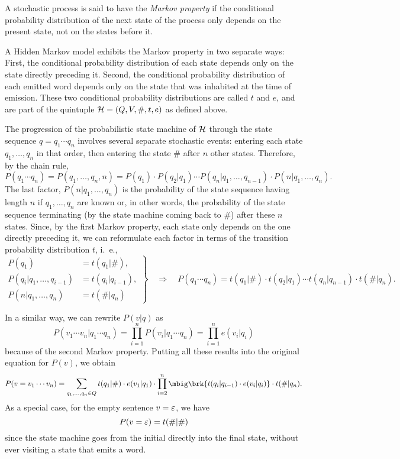 \begin{definition}
 A stochastic process is said to have the \emph{Markov property} if the
 conditional probability distribution of the next state of the process only
 depends on the present state, not on the states before it.
\end{definition}

A Hidden Markov model exhibits the Markov property in two separate ways: First,
the conditional probability distribution of each state depends only on the
state directly preceding it. Second, the conditional probability distribution
of each emitted word depends only on the state that was inhabited at the time
of emission. These two conditional probability distributions are called $t$ and
$e$, and are part of the quintuple $\mathcal H=(Q,V,\#,t,e)$ as defined above.

The progression of the probabilistic state machine of $\mathcal H$ through the state
sequence $q=q_1\cdots q_n$ involves several separate stochastic events:
entering each state $q_1,\ldots,q_n$ in that order, then entering the state
$\#$ after $n$ other states. Therefore, by the chain rule,
\[
 P(q_1\cdots q_n) = P(q_1,\ldots,q_n,n) = P(q_1) \cdot P(q_2|q_1) \cdots P(q_n|q_1,\ldots,q_{n-1}) \cdot P(n|q_1,\ldots,q_n).
\]
The last factor, $P(n|q_1,\ldots,q_n)$ is the probability of the state sequence
having length $n$ if $q_1,\ldots,q_n$ are known or, in other words, the
probability of the state sequence terminating (by the state machine coming back
to $\#$) after these $n$ states. Since, by the first Markov property, each
state only depends on the one directly preceding it, we can reformulate each
factor in terms of the transition probability distribution $t$, i.~e.,
\[
 \left.\begin{aligned}
  P(q_1) &= t(q_1|\#), \\
  P(q_i|q_1,\ldots,q_{i-1}) &= t(q_i|q_{i-1}), \\
  P(n|q_1,\ldots,q_n) &= t(\#|q_n)
 \end{aligned}\right\}
 \quad\Rightarrow\quad
 P(q_1\cdots q_n) = t(q_1|\#) \cdot t(q_2|q_1) \cdots t(q_n|q_{n-1}) \cdot t(\#|q_n).
\]

In a similar way, we can rewrite $P(v|q)$ as
\[
 P(v_1\cdots v_n|q_1\cdots q_n) = \prod_{i=1}^n P(v_i|q_1\cdots q_n) = \prod_{i=1}^n e(v_i|q_i)
\]
because of the second Markov property.
Putting all these results into the original equation for $P(v)$, we obtain
\begin{equation}\label{eq:03-p-v}
 P(v=v_1\cdots v_n) = \sum_{q_1,\ldots,q_n\in Q} t(q_1|\#) \cdot e(v_1|q_1) \cdot \prod_{i=2}^n \mbig\brk{t(q_i|q_{i-1}) \cdot e(v_i|q_i)} \cdot t(\#|q_n).
\end{equation}
As a special case, for the empty sentence $v=\varepsilon$, we have
\begin{equation}\label{eq:03-p-v-eps}
 P(v=\varepsilon) = t(\#|\#)
\end{equation}
since the state machine goes from the initial directly into the final state,
without ever visiting a state that emits a word.

